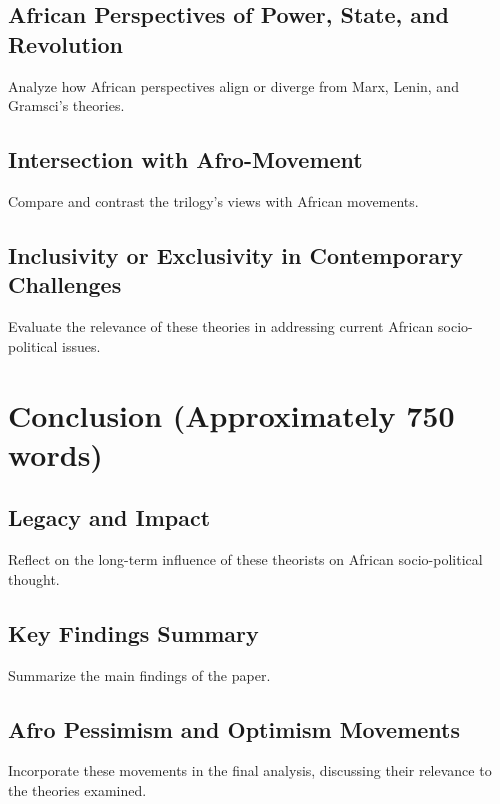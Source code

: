 \documentclass[12pt]{article}
\begin{document}
\subsection*{African Perspectives of Power, State, and Revolution}
Analyze how African perspectives align or diverge from Marx, Lenin, and Gramsci's theories.

\subsection*{Intersection with Afro-Movement}
Compare and contrast the trilogy's views with African movements.

\subsection*{Inclusivity or Exclusivity in Contemporary Challenges}
Evaluate the relevance of these theories in addressing current African socio-political issues.

\section{Conclusion (Approximately 750 words)}
\subsection*{Legacy and Impact}
Reflect on the long-term influence of these theorists on African socio-political thought.

\subsection*{Key Findings Summary}
Summarize the main findings of the paper.

\subsection*{Afro Pessimism and Optimism Movements}
Incorporate these movements in the final analysis, discussing their relevance to the theories examined.
\end{document}
